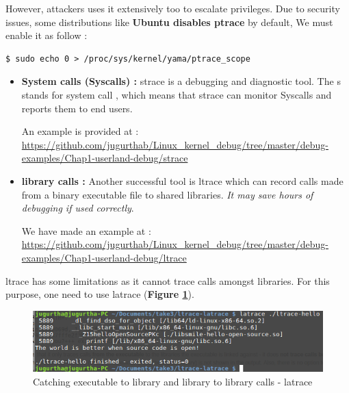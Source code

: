 However, attackers uses it extensively too to escalate privileges.
Due to security issues, some distributions like \textbf{\color{red}Ubuntu disables ptrace} by default, We must enable it as follow :

\begin{lstlisting}[style=BashInputStyle]
$ sudo echo 0 > /proc/sys/kernel/yama/ptrace_scope
\end{lstlisting}

\begin{itemize}
	\item \textbf{System calls (Syscalls) : }
	strace is a debugging and diagnostic tool. The \og s \fg stands for \og system call \fg, which means that strace can monitor
Syscalls and reports them to end users.

An example is provided at : {\color{blue}\url{https://github.com/jugurthab/Linux_kernel_debug/tree/master/debug-examples/Chap1-userland-debug/strace}}

	\item \textbf{library calls : }
	Another successful tool is \og ltrace \fg which can record calls made from a binary executable file to shared libraries. \emph{It may save hours of debugging if used correctly}.
	
We have made an example at : {\color{blue}\url{https://github.com/jugurthab/Linux_kernel_debug/tree/master/debug-examples/Chap1-userland-debug/ltrace}}
\end{itemize}

ltrace has some limitations as it cannot trace calls amongst libraries. For this purpose, one need to use latrace (\textbf{Figure \ref{Catching executable to library and library to library calls - latrace}}).

\begin{figure}[H]
		\centering
        \includegraphics[scale=0.40]{img/solution/latrace-output.png}
        \caption{Catching executable to library and library to library calls - latrace}
        \label{Catching executable to library and library to library calls - latrace}
    \end{figure}



